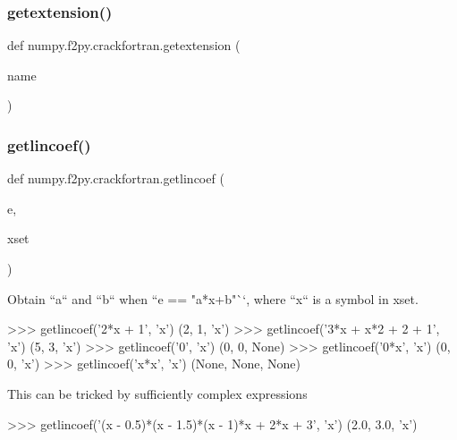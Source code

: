 \mbox{\label{namespacenumpy_1_1f2py_1_1crackfortran_a36c57bf6d0cb566159c0eebb8127a334}} 
\subsubsection{\texorpdfstring{getextension()}{getextension()}}
{\footnotesize\ttfamily def numpy.\+f2py.\+crackfortran.\+getextension (\begin{DoxyParamCaption}\item[{}]{name }\end{DoxyParamCaption})}

\mbox{\label{namespacenumpy_1_1f2py_1_1crackfortran_a21249b22429898a6922052332c6b109c}} 
\subsubsection{\texorpdfstring{getlincoef()}{getlincoef()}}
{\footnotesize\ttfamily def numpy.\+f2py.\+crackfortran.\+getlincoef (\begin{DoxyParamCaption}\item[{}]{e,  }\item[{}]{xset }\end{DoxyParamCaption})}

\begin{DoxyVerb}Obtain ``a`` and ``b`` when ``e == "a*x+b"``, where ``x`` is a symbol in
xset.

>>> getlincoef('2*x + 1', {'x'})
(2, 1, 'x')
>>> getlincoef('3*x + x*2 + 2 + 1', {'x'})
(5, 3, 'x')
>>> getlincoef('0', {'x'})
(0, 0, None)
>>> getlincoef('0*x', {'x'})
(0, 0, 'x')
>>> getlincoef('x*x', {'x'})
(None, None, None)

This can be tricked by sufficiently complex expressions

>>> getlincoef('(x - 0.5)*(x - 1.5)*(x - 1)*x + 2*x + 3', {'x'})
(2.0, 3.0, 'x')
\end{DoxyVerb}
 \mbox{\label{namespacenumpy_1_1f2py_1_1crackfortran_ada76bc2a84df7f6e459990f3184114a5}} 
